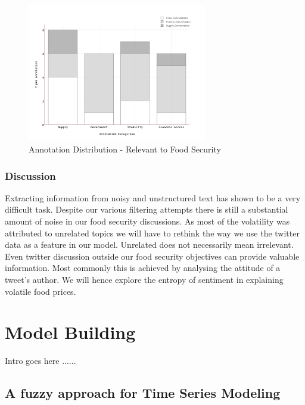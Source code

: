 \begin{figure}[H]
        \centering
         \includegraphics[width=0.7\textwidth ]{img/anal/annotation_dist}
              
        \caption{Annotation Distribution - Relevant to Food Security}
        \label{fig:annotation_dist}
\end{figure}


\subsection{Discussion}

Extracting information from noisy and unstructured text has shown to be a very difficult task. Despite our various filtering attempts there is still a substantial amount of noise in our food security discussions. As most of the volatility was attributed to unrelated topics we will have to rethink the way we use the twitter data as a feature in our model. Unrelated does not necessarily mean irrelevant. Even twitter discussion outside our food security objectives can provide valuable information. Most commonly this is achieved by analysing the attitude of a tweet's author. We will hence explore the entropy of sentiment in explaining volatile food prices. 




\chapter {Model Building}
\label{model}

Intro goes here ......

\section{A fuzzy approach for Time Series Modeling}


